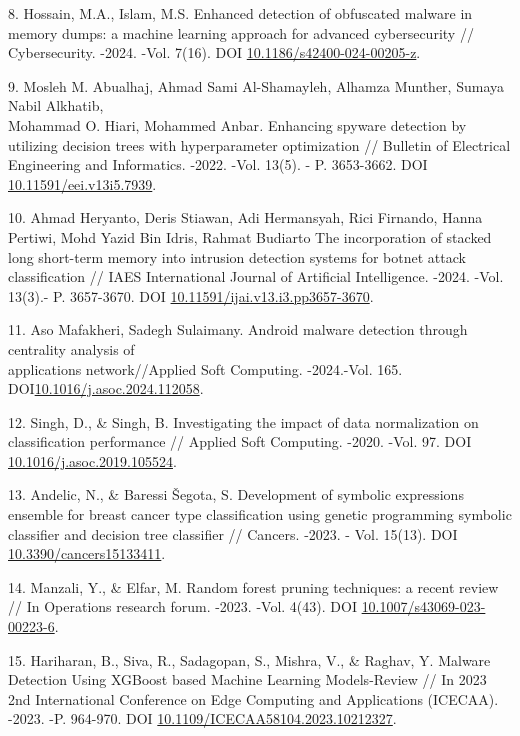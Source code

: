 \begin{references}
8. Hossain, M.A., Islam, M.S. Enhanced detection of obfuscated malware in
memory dumps: a machine learning approach for advanced cybersecurity
// Cybersecurity. -2024. -Vol. 7(16).
DOI \href{https://doi.org/10.1186/s42400-024-00205-z}{10.1186/s42400-024-00205-z}.

9. Mosleh M. Abualhaj, Ahmad Sami Al-Shamayleh, Alhamza Munther, Sumaya
Nabil Alkhatib, \\Mohammad O. Hiari, Mohammed Anbar\emph{.} Enhancing
spyware detection by utilizing decision trees with hyperparameter
optimization // Bulletin of Electrical Engineering and Informatics.
-2022. -Vol. 13(5). - P. 3653-3662. DOI
\href{https://doi.org/10.11591/eei.v13i5.7939}{10.11591/eei.v13i5.7939}.

10. Ahmad Heryanto, Deris Stiawan, Adi Hermansyah, Rici Firnando, Hanna
Pertiwi, Mohd Yazid Bin Idris, Rahmat Budiarto The incorporation of
stacked long short-term memory into intrusion detection systems for
botnet attack classification // IAES International Journal of
Artificial Intelligence. -2024. -Vol. 13(3).- P. 3657-3670. DOI
\href{https://doi.org/10.11591/ijai.v13.i3.pp3657-3670}{10.11591/ijai.v13.i3.pp3657-3670}.

11. Aso Mafakheri, Sadegh Sulaimany. Android malware detection through
centrality analysis of \\applications network//Applied Soft Computing.
-2024.-Vol. 165. DOI\href{https://doi.org/10.1016/j.asoc.2024.112058}{10.1016/j.asoc.2024.112058}.

12. Singh, D., \& Singh, B. Investigating the impact of data normalization
on classification performance // Applied Soft Computing. -2020. -Vol.
97. DOI
\href{https://doi.org/10.1016/j.asoc.2019.105524}{10.1016/j.asoc.2019.105524}.

13. Andelic, N., \& Baressi Šegota, S. Development of symbolic expressions
ensemble for breast cancer type classification using genetic
programming symbolic classifier and decision tree classifier //
Cancers. -2023. - Vol. 15(13). DOI
\href{https://doi.org/10.3390/cancers15133411}{10.3390/cancers15133411}.

14. Manzali, Y., \& Elfar, M. Random forest pruning techniques: a recent
review // In Operations research forum. -2023. -Vol. 4(43). DOI
\href{https://doi.org/10.1007/s43069-023-00223-6}{10.1007/s43069-023-00223-6}.

15. Hariharan, B., Siva, R., Sadagopan, S., Mishra, V., \& Raghav, Y.
Malware Detection Using XGBoost based Machine Learning Models-Review
// In 2023 2nd International Conference on Edge Computing and
Applications (ICECAA). -2023. -P. 964-970.
DOI \href{https://doi.org/10.1109/ICECAA58104.2023.10212327}{10.1109/ICECAA58104.2023.10212327}.


\end{references}
